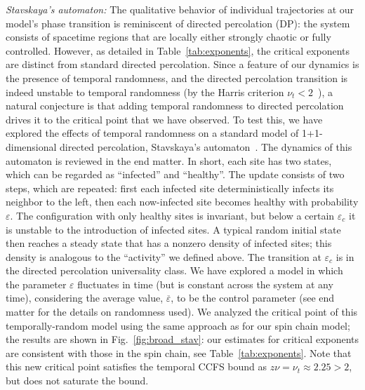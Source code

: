\documentclass[twocolumn,amsmath,amssymb,floatfix,superscriptaddress,aps,prl]{revtex4-2}
\begin{document}
{\it Stavskaya's automaton:} The qualitative behavior of individual trajectories at our model's phase transition is reminiscent of directed percolation (DP): the system consists of spacetime regions that are locally either strongly chaotic or fully controlled. However, as detailed in Table~\ref{tab:exponents}, the critical exponents are distinct from standard directed percolation. Since a feature of our dynamics %
is the presence of temporal randomness, and the directed percolation transition is indeed unstable to temporal randomness (by the Harris criterion $\nu_t < 2$~\cite{ccfs1,PhysRevE.93.032143,Shkolnik-2025}), a natural conjecture is that adding temporal randomness to directed percolation drives it to the critical point that we have observed. To test this, we have explored the effects of temporal randomness on a standard model of 1+1-dimensional directed percolation, Stavskaya's automaton~\cite{stavskaya1968homogeneous,shnirman1968ergodicity,toom1968family}. The dynamics of this automaton is reviewed in the end matter. 
%
In short, each site has two states, which can be regarded as ``infected'' and ``healthy''.  The update consists of two steps, which are repeated: first each infected site deterministically infects its neighbor to the left, then each now-infected site becomes healthy with probability $\varepsilon$.  The configuration with only healthy sites is invariant, but below a certain $\varepsilon_c$ it is unstable to the introduction of infected sites. A typical random initial state then reaches a steady state that has a nonzero density of infected sites; this density is analogous to the ``activity'' we defined above. The transition at $\varepsilon_c$ is in the directed percolation universality class. We have explored a model in which the parameter $\varepsilon$ fluctuates in time (but is constant across the system at any time), considering the average value, $\overline{\varepsilon}$, to be the control parameter (see end matter for the details on randomness used). We analyzed the critical point of this temporally-random model using the same approach as for our spin chain model; the results are shown in Fig.~\ref{fig:broad_stav}: our estimates for critical exponents are consistent with those in the spin chain, see Table~\ref{tab:exponents}. Note that this new critical point satisfies the temporal CCFS bound as $z\nu=\nu_t\approx 2.25>2$, but does not saturate the bound. %
\end{document}
